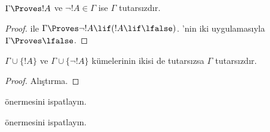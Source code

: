 \documentclass[../../../include/open-logic-section]{subfiles}
\begin{document}
\begin{prop}
  $\Gamma \Proves !A$ ve $\lnot !A \in \Gamma$ ise $\Gamma$ tutarsızdır.
\end{prop}

\begin{proof}
   ile $\Gamma \Proves \lnot !A \lif
  (!A \lif \lfalse)$. 'nin iki uygulamasıyla
  $\Gamma \Proves \lfalse$.
\end{proof}

\begin{prop}
  $\Gamma \cup \{!A\}$ ve $\Gamma \cup \{\lnot !A\}$ kümelerinin ikisi de
  tutarsızsa $\Gamma$ tutarsızdır.
\end{prop}

\begin{proof}
Alıştırma.
\end{proof}

\begin{prob}
   önermesini ispatlayın.
\end{prob}
\tagendprob

\begin{prob}
   önermesini ispatlayın.
\end{prob}
\tagendprob
\end{document}
